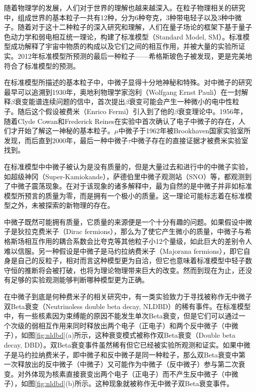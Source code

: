 
随着物理学的发展，人们对于世界的理解也越来越深入。在粒子物理相关的研究中，组成世界的基本粒子一共有12种，分为6种夸克，3种带电轻子以及3种中微子。随着对于这十二种粒子的深入研究和理解，人们在量子场论的框架下基于量子色动力学和弱电相互统一理论，构建了标准模型（Standard Model, SM）。标准模型成功解释了宇宙中物质的构成以及它们之间的相互作用，并被大量的实验所证实。2012年标准模型所预测的最后一种粒子——希格斯玻色子被发现，更是完美地符合了标准模型的预测。

在标准模型所描述的基本粒子中，中微子显得十分地神秘和特殊。对中微子的研究最早可以追溯到1930年，奥地利物理学家泡利（Wolfgang Ernst Pauli）在一封解释$\beta$衰变能谱连续问题的信中，首次提出$\beta$衰变可能会产生一种微小的电中性粒子。随后这个假设被费米（Enrico Fermi）引入到了他的$\beta$衰变理论中\supercite{wilson1968fermi}。1956年，随着Clyde Cowan和Frederick Reines在实验中首次确认了电子中微子的存在\supercite{cowan1991detection}，人们才开始了解这一神秘的基本粒子。$\mu$中微子于1962年被Brookhaven国家实验室所发现\supercite{danby1962observation}，而后直到2000年，最后一种中微子$\tau$中微子存在的直接证据才被费米实验室找到\supercite{kodama2001observation}。

在标准模型中中微子被认为是没有质量的，但是大量过去和进行中的中微子实验，如超级神冈（Super-Kamiokande）\supercite{fukuda1998evidence}，萨德伯里中微子观测站（SNO）\supercite{ahmad2002direct}等，都观测到了中微子震荡现象。在对于该现象的诸多解释中，最为自然的是中微子并非如标准模型所预言的质量为零，而是拥有一个极小的质量。这一理论可能标志着在标准模型之外，未被探索的新物理的存在。

中微子既然可能拥有质量，它质量的来源便是一个十分有趣的问题。如果假设中微子是狄拉克费米子（Dirac fermions），那么为了使它产生微小的质量，中微子与希格斯场相互作用的耦合系数会比夸克等其他粒子小12个量级，如此巨大的差别令人难以信服。另一种假设是中微子是马约拉纳费米子（Majorana fermions），即它自身是自己的反粒子，相对而言这种模型更为自洽，但它也意味着标准模型中轻子数守恒的推断将会被打破，也将为理论物理带来巨大的改变。然而到现在为止，还没有足够的实验观测能够判断哪种模型更为正确。

在中微子到底是何种费米子的相关研究中，有一类实验致力于寻找被称作无中微子双Beta衰变（Neutrinoless double beta decay, NLDBD）\supercite{avignone2008double}的稀有事件。在标准模型中，有一些核素因为束缚能的原因不能发生单次Beta衰变，但是它们可以通过一个次级的弱相互作用来同时释放出两个电子（正电子）和两个反中微子（中微子），如图\ref{fig:nldbd}(a)所示，这种衰变模式被称作双Beta衰变（Double beta decay, DBD）。双Beta衰变事件虽然稀有但它已经被实验所观测和证实。如果中微子是马约拉纳费米子，即中微子和反中微子是同一种粒子，那么双Beta衰变中第一次释放出的反中微子（中微子）又可能作为中微子（反中微子）参与第二次衰变。对外体现为核素直接衰变出两个电子（正电子）而不产生反中微子（中微子），如图\ref{fig:nldbd}(b)所示。这种现象就被称作无中微子双Beta衰变事件。

